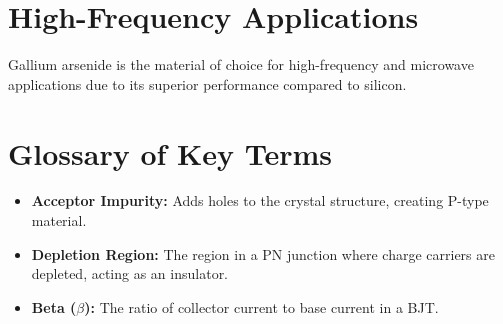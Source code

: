 \section*{High-Frequency Applications}
Gallium arsenide is the material of choice for high-frequency and microwave applications due to its superior performance compared to silicon.

\section*{Glossary of Key Terms}
\begin{itemize}
    \item \textbf{Acceptor Impurity:} Adds holes to the crystal structure, creating P-type material.
    \item \textbf{Depletion Region:} The region in a PN junction where charge carriers are depleted, acting as an insulator.
    \item \textbf{Beta ($\beta$):} The ratio of collector current to base current in a BJT.
\end{itemize}


